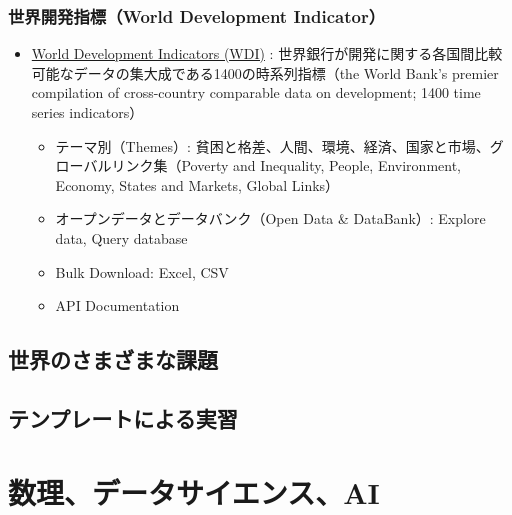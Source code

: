 \documentclass[
]{bxjsbook}
\providecommand{\tightlist}{%
  \setlength{\itemsep}{0pt}\setlength{\parskip}{0pt}}
\theoremstyle{definition}
\theoremstyle{definition}
\theoremstyle{definition}
\theoremstyle{definition}
\theoremstyle{remark}
\begin{document}
\hypertarget{ux4e16ux754cux958bux767aux6307ux6a19world-development-indicator}{%
\subsubsection{世界開発指標（World Development Indicator）}\label{ux4e16ux754cux958bux767aux6307ux6a19world-development-indicator}}

\begin{itemize}
\tightlist
\item
  \href{https://datatopics.worldbank.org/world-development-indicators/}{World Development Indicators (WDI)} : 世界銀行が開発に関する各国間比較可能なデータの集大成である1400の時系列指標（the World Bank's premier compilation of cross-country comparable data on development; 1400 time series indicators）

  \begin{itemize}
  \tightlist
  \item
    テーマ別（Themes）: 貧困と格差、人間、環境、経済、国家と市場、グローバルリンク集（Poverty and Inequality, People, Environment, Economy, States and Markets, Global Links）
  \item
    オープンデータとデータバンク（Open Data \& DataBank）: Explore data, Query database
  \item
    Bulk Download: Excel, CSV
  \item
    API Documentation
  \end{itemize}
\end{itemize}

\hypertarget{ux4e16ux754cux306eux3055ux307eux3056ux307eux306aux8ab2ux984c}{%
\subsection{世界のさまざまな課題}\label{ux4e16ux754cux306eux3055ux307eux3056ux307eux306aux8ab2ux984c}}

\hypertarget{ux30c6ux30f3ux30d7ux30ecux30fcux30c8ux306bux3088ux308bux5b9fux7fd2}{%
\subsection{テンプレートによる実習}\label{ux30c6ux30f3ux30d7ux30ecux30fcux30c8ux306bux3088ux308bux5b9fux7fd2}}

\hypertarget{introai}{%
\section{数理、データサイエンス、AI}\label{introai}}
\end{document}
